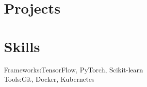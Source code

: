 \documentclass[]{resume-openfont}
\begin{document}
\section{Projects}
\sectionsep



\section{Skills}

\begin{skillList}
    {Frameworks:}{TensorFlow, PyTorch, Scikit-learn}
    \\
    {Tools:}{Git, Docker, Kubernetes}
\end{skillList}
\end{document}
